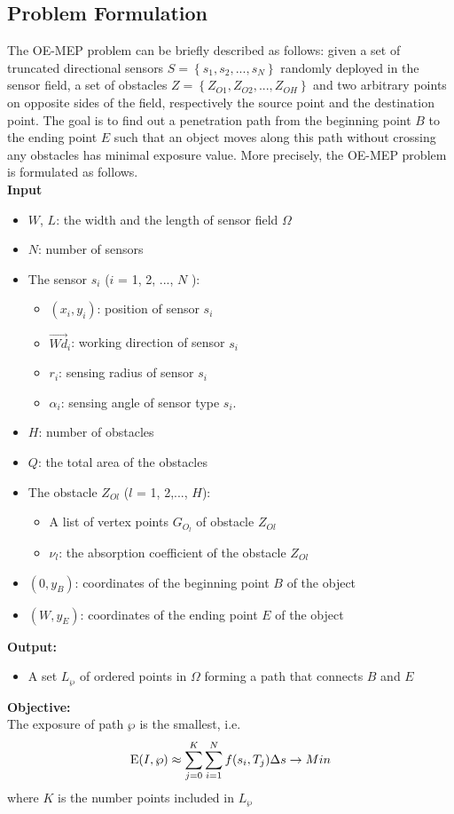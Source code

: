 \documentclass[final]{elsarticle}
\begin{document}
\subsection{Problem Formulation}
The OE-MEP problem can be briefly described as follows: given a set of truncated directional sensors $S = \left\{ {{s_1},{s_2},...,{s_N}} \right\}$ randomly deployed in the sensor field, a set of obstacles $Z = \left\{ {{Z_{O1}},{Z_{O2}},...,{Z_{OH}}} \right\}$ and two arbitrary points on opposite sides of the field, respectively the source point and the destination point. The goal is to find out a penetration path from the beginning point $B$ to the ending point $E$ such that an object moves along this path without crossing any obstacles has minimal exposure value. More precisely, the OE-MEP problem is formulated as follows.\\
\textbf{Input}
\begin{itemize}
		\itemsep-0.2em
		\item $W$, $L$: the width and the length of sensor field $\Omega$
		\item $N$: number of sensors
		\item The sensor $s_i$ ($ i $ = 1, 2, ..., $ N $ ):
		\begin{itemize}
			 \item $({x_i},y_i)$: position of sensor $ s_i $
			 \item $\overrightarrow{Wd}_i$: working direction of sensor $s_i$
			 \item $ r_i $: sensing radius of sensor $ s_i $
			 \item ${\alpha _i}$: sensing angle of sensor type $ s_i $.
		 \end{itemize}
		 \item $H$: number of obstacles
		 \item $Q$: the total area of the obstacles 
		 \item The obstacle $Z_{Ol}$ ($ l $ = 1, 2,..., $H$): 
		 \begin{itemize}
		 	\item A list of vertex points $ G_{O_l} $ of obstacle $Z_{Ol}$
		 	\item $ \nu_l $: the absorption coefficient of the obstacle $Z_{Ol}$
		 \end{itemize}
		\item $(0, y_B)$: coordinates of the beginning point $B$ of the object
		\item $(W, y_E)$: coordinates of the ending point $E$ of the object
\end{itemize}
\textbf{Output:}
\begin{itemize}
	\item A set ${L_\wp }$ of ordered points in $\Omega $ forming a path that connects $ B $ and $ E $ 
\end{itemize}
\textbf{Objective:}\\
The exposure of path  $\wp $ is the smallest, i.e.
\begin{equation}
\label{eq9}
{\rm E}(I,\wp )  \approx \sum\limits_{j = 0}^K {\sum\limits_{i = 1}^N {f({s_i},{T_j})} } \Delta s  \to Min
\end{equation}
where $ K $ is the number points included in ${L_\wp }$
\end{document}
